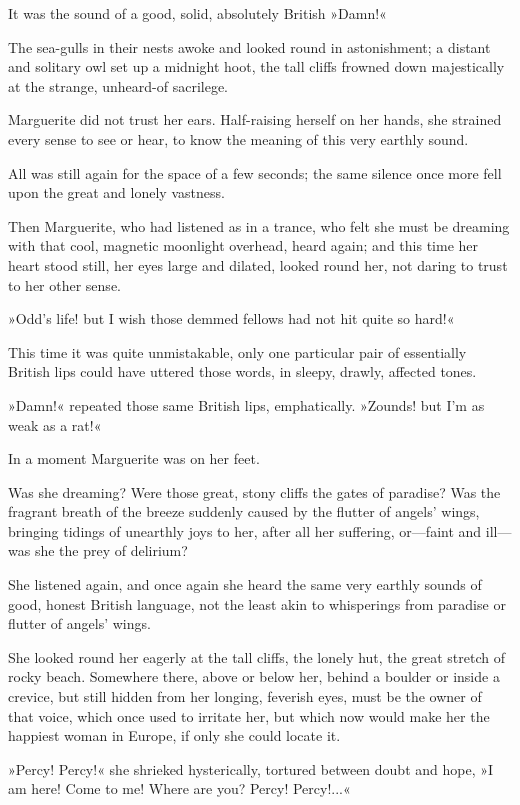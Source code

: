 It was the sound of a good, solid, absolutely British »Damn!«

The sea-gulls in their nests awoke and looked round in astonishment; a distant and solitary owl set up a midnight hoot, the tall cliffs frowned down majestically at the strange, unheard-of sacrilege.

Marguerite did not trust her ears. Half-raising herself on her hands, she strained every sense to see or hear, to know the meaning of this very earthly sound.

All was still again for the space of a few seconds; the same silence once more fell upon the great and lonely vastness.

Then Marguerite, who had listened as in a trance, who felt she must be dreaming with that cool, magnetic moonlight overhead, heard again; and this time her heart stood still, her eyes large and dilated, looked round her, not daring to trust to her other sense.

»Odd's life! but I wish those demmed fellows had not hit quite so hard!«

This time it was quite unmistakable, only one particular pair of essentially British lips could have uttered those words, in sleepy, drawly, affected tones.

»Damn!« repeated those same British lips, emphatically. »Zounds! but I'm as weak as a rat!«

In a moment Marguerite was on her feet.

Was she dreaming? Were those great, stony cliffs the gates of paradise? Was the fragrant breath of the breeze suddenly caused by the flutter of angels' wings, bringing tidings of unearthly joys to her, after all her suffering, or\allowbreak---\allowbreak faint and ill\allowbreak---\allowbreak was she the prey of delirium?

She listened again, and once again she heard the same very earthly sounds of good, honest British language, not the least akin to whisperings from paradise or flutter of angels' wings.

She looked round her eagerly at the tall cliffs, the lonely hut, the great stretch of rocky beach. Somewhere there, above or below her, behind a boulder or inside a crevice, but still hidden from her longing, feverish eyes, must be the owner of that voice, which once used to irritate her, but which now would make her the happiest woman in Europe, if only she could locate it.

»Percy! Percy!« she shrieked hysterically, tortured between doubt and hope, »I am here! Come to me! Where are you? Percy! Percy!...«

